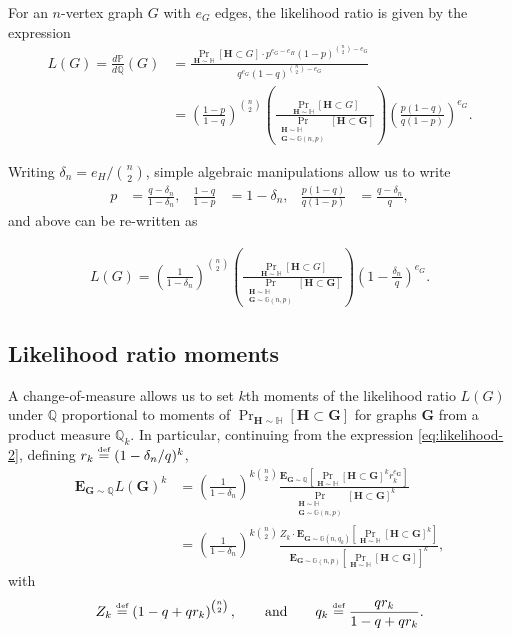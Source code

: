 \documentclass[11pt]{article}
\newcommand{\e}{{\mathbf E}}
\newcommand{\bG}{\mathbf{G}}
\newcommand{\bH}{\mathbf{H}}
\newcommand{\bbG}{\mathbb{G}}
\newcommand{\bbH}{\mathbb{H}}
\newcommand{\bbP}{\mathbb{P}}
\newcommand{\bbQ}{\mathbb{Q}}
\newcommand\defeq{\stackrel{\text{\tiny def}}{=}}
\numberwithin{equation}{section}
\numberwithin{thm}{section}
\begin{document}
For an $n$-vertex graph $G$ with $e_G$ edges, the likelihood ratio is given by the expression
\begin{align}
L(G) 
= \frac{d\bbP}{d\bbQ}(G) 
&= \frac{\Pr_{\bH \sim \bbH}[\bH \subset G] \cdot p^{e_G-e_H}(1-p)^{\binom{n}{2}-e_G}}{q^{e_G}(1-q)^{\binom{n}{2}-e_G}}\nonumber\\
&= \left(\frac{1-p}{1-q}\right)^{\binom{n}{2}}\left(\frac{\Pr_{\bH \sim \bbH}[\bH \subset G]}{\Pr_{\substack{\bH\sim\bbH\\ \bG \sim \bbG(n,p)}}[\bH \subset \bG]}\right) \left(\frac{p(1-q)}{q(1-p)}\right)^{e_G}.\label{eq:likelihood}
\end{align}

\newcommand{\deltanH}{\delta_{n}}
Writing $\deltanH = e_H / \binom{n}{2}$, simple algebraic manipulations allow us to write
\begin{align*}
    p &= \frac{q-\deltanH}{1-\deltanH}, &
    \frac{1-q}{1-p} &= 1-\deltanH, &
    \frac{p(1-q)}{q(1-p)} &=\frac{q-\deltanH}{q},
\end{align*}
and  above can be re-written as

\begin{align}
L(G) = \left(\frac{1}{1-\deltanH}\right)^{\binom{n}{2}}\left(\frac{\Pr_{\bH \sim \bbH}[\bH \subset G]}{\Pr_{\substack{\bH\sim\bbH\\ \bG \sim \bbG(n,p)}}[\bH \subset \bG]}\right) \left(1 - \frac{\deltanH}{q}\right)^{e_G}.\label{eq:likelihood-2}
\end{align}


\subsection{Likelihood ratio moments}

A change-of-measure allows us to set $k$th moments of the likelihood ratio $L(G)$ under $\bbQ$ proportional to moments of $\Pr_{\bH \sim \bbH}[\bH \subset \bG]$ for graphs $\bG$ from a product measure $\bbQ_k$.
In particular, continuing from the expression \cref{eq:likelihood-2}, defining $r_k \defeq (1-\deltanH/q)^k$,
\begin{align}
\e_{\bG \sim \bbQ} L(\bG)^k
&= \left(\frac{1}{1-\deltanH}\right)^{k\binom{n}{2}} \frac{\e_{\bG \sim \bbQ}\left[\Pr_{\bH \sim \bbH}[\bH \subset \bG]^k r_k^{e_{\bG}}\right]}{\Pr_{\substack{\bH \sim \bbH\\\bG \sim \bbG(n,p)}}[\bH \subset \bG]^k}\nonumber \\
&= \left(\frac{1}{1-\deltanH}\right)^{k\binom{n}{2}} \frac{Z_k \cdot \e_{\bG \sim \bbG(n,q_k)}\left[\Pr_{\bH \sim \bbH}[\bH\subset\bG]^k\right]}{\e_{\bG \sim \bbG(n,p)}\left[\Pr_{\bH \sim \bbH}[\bH \subset\bG]\right]^k}, \label{eq:homs}
\end{align}
with
\begin{align}
Z_k \defeq \left(1-q + q r_k\right)^{\binom{n}{2}}, \qquad \text{and} \qquad
q_k \defeq \frac{q r_k}{1-q + q r_k}.
\end{align}
\end{document}
